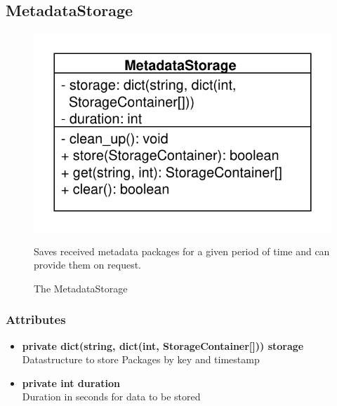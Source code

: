 \subsection{MetadataStorage}
\begin{figure}[htbp]
	\begin{minipage}[t]{7cm}
		\vspace{0pt}
		\centering
		\includegraphics[scale=0.6]{./diagram_pictures/MetadataStorage.pdf}
		\caption{The MetadataStorage}
	\end{minipage}
	\hfill
	\begin{minipage}[t]{8cm}
		\vspace{10pt}
		Saves received metadata packages for a given period of time and can provide them on request.
	\end{minipage}
\end{figure}

\subsubsection{Attributes}
\begin{itemize}
	\item \textbf{private dict(string, dict(int, StorageContainer[])) storage}\\
	Datastructure to store Packages by key and timestamp
	\item \textbf{private int duration}\\
	Duration in seconds for data to be stored
\end{itemize}
